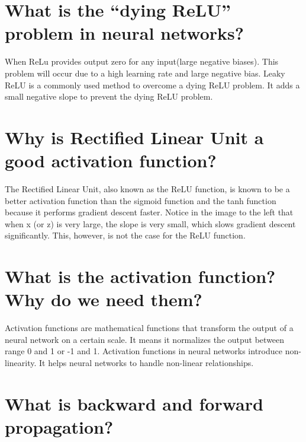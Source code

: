 \documentclass[
]{book}
\begin{document}
\hypertarget{what-is-the-dying-relu-problem-in-neural-networks}{%
\section{What is the ``dying ReLU'' problem in neural networks?}\label{what-is-the-dying-relu-problem-in-neural-networks}}

When ReLu provides output zero for any input(large negative biases). This problem will occur due to a high learning rate and large negative bias. Leaky ReLU is a commonly used method to overcome a dying ReLU problem. It adds a small negative slope to prevent the dying ReLU problem.

\hypertarget{why-is-rectified-linear-unit-a-good-activation-function}{%
\section{Why is Rectified Linear Unit a good activation function?}\label{why-is-rectified-linear-unit-a-good-activation-function}}

The Rectified Linear Unit, also known as the ReLU function, is known to be a better activation function than the sigmoid function and the tanh function because it performs gradient descent faster. Notice in the image to the left that when x (or z) is very large, the slope is very small, which slows gradient descent significantly. This, however, is not the case for the ReLU function.

\hypertarget{what-is-the-activation-function-why-do-we-need-them}{%
\section{What is the activation function? Why do we need them?}\label{what-is-the-activation-function-why-do-we-need-them}}

Activation functions are mathematical functions that transform the output of a neural network on a certain scale. It means it normalizes the output between range 0 and 1 or -1 and 1. Activation functions in neural networks introduce non-linearity. It helps neural networks to handle non-linear relationships.

\hypertarget{what-is-backward-and-forward-propagation}{%
\section{What is backward and forward propagation?}\label{what-is-backward-and-forward-propagation}}
\end{document}
